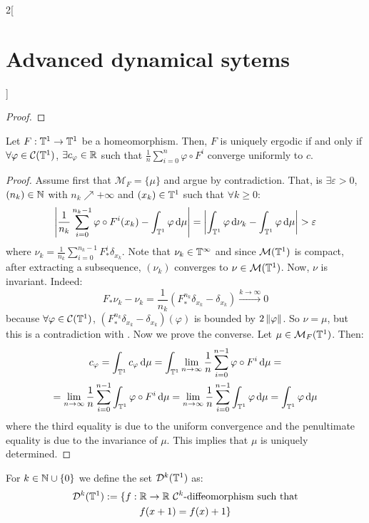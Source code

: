\documentclass[../../../main_math.tex]{subfiles}
\begin{document}
\begin{multicols}{2}[\section{Advanced dynamical sytems}]
\begin{proof}
  \end{proof}
  \begin{proposition}
    Let $F:\mathbb{T}^1\to\mathbb{T}^1$ be a homeomorphism. Then, $F$ is uniquely ergodic if and only if $\forall \varphi\in\mathcal{C}(\mathbb{T}^1)$, $\exists c_\varphi\in\mathbb{R}$ such that $\frac{1}{n}\sum_{i=0}^n\varphi\circ F^i$ converge uniformly to $c$.
  \end{proposition}
  \begin{proof}
    Assume first that $\mathcal{M}_F=\{\mu\}$ and argue by contradiction. That, is $\exists \varepsilon>0$, $(n_k)\in\mathbb{N}$ with $n_k\nearrow +\infty$ and $(x_k)\in\mathbb{T}^1$ such that $\forall k\geq 0$:
    \begin{equation}\label{ADS:nuk_mu}
      \abs{\frac{1}{n_k}\sum_{i=0}^{n_k-1}\varphi\circ F^i(x_k)-\int_{\mathbb{T}^1}\varphi\dd{\mu}}=\abs{\int_{\mathbb{T}^1}\varphi\dd{\nu_k}-\int_{\mathbb{T}^1}\varphi\dd{\mu}}>\varepsilon
    \end{equation}
    $$
    $$
    where $\nu_k=\frac{1}{n_k}\sum_{i=0}^{n_k-1}F_*^i\delta_{x_k}$. Note that $\nu_k\in\mathcal{\mathbb{T}^1}$ and since $\mathcal{M}(\mathbb{T}^1)$ is compact, after extracting a subsequence, $(\nu_k)$ converges to $\nu\in\mathcal{M}(\mathbb{T}^1)$. Now, $\nu$ is invariant. Indeed:
    $$
      F_*\nu_k-\nu_k=\frac{1}{n_k}(F_*^{n_k}\delta_{x_k}-\delta_{x_k})\overset{k\to\infty}{\longrightarrow} 0
    $$
    because $\forall \varphi\in\mathcal{C}(\mathbb{T}^1)$, $(F_*^{n_k}\delta_{x_k}-\delta_{x_k})(\varphi)$ is bounded by $2\left\|\varphi\right\|$. So $\nu =\mu$, but this is a contradiction with . Now we prove the converse. Let $\mu\in\mathcal{M}_F(\mathbb{T}^1)$. Then:
    \begin{multline*}
      c_\varphi =\int_{\mathbb{T}^1}c_\varphi\dd{\mu} =\int_{\mathbb{T}^1}\lim_{n\to\infty}\frac{1}{n}\sum_{i=0}^{n-1}\varphi\circ F^i\dd{\mu} =\\
      =\lim_{n\to\infty}\frac{1}{n}\sum_{i=0}^{n-1}\int_{\mathbb{T}^1}\varphi\circ F^i\dd{\mu}=\lim_{n\to\infty}\frac{1}{n}\sum_{i=0}^{n-1}\int_{\mathbb{T}^1}\varphi\dd{\mu} =\int_{\mathbb{T}^1}\varphi\dd{\mu}
    \end{multline*}
    where the third equality is due to the uniform convergence and the penultimate equality is due to the invariance of $\mu$. This implies that $\mu$ is uniquely determined.
  \end{proof}
  \begin{definition}
    For $k\in\mathbb{N}\cup\{0\}$ we define the set $\mathcal{D}^k(\mathbb{T}^1)$ as:
    \begin{multline*}
      \mathcal{D}^k(\TT^1):=\{f:\RR\to\RR \text{ $\mathcal{C}^k$-diffeomorphism such that}\\f(x+1)=f(x)+1\}

\end{multline*}
\end{definition}
\end{multicols}
\end{document}
